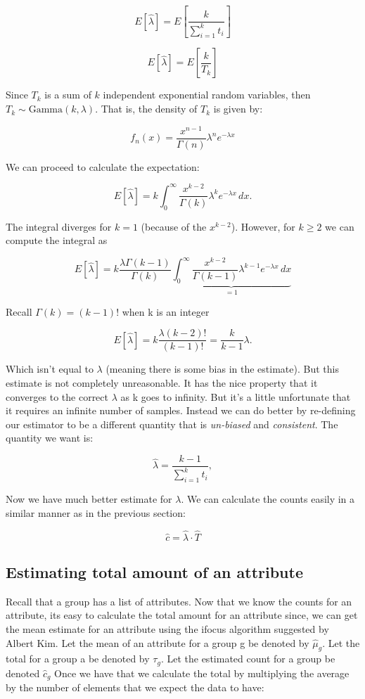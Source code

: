 \documentclass[a4paper]{article}
\begin{document}
$$E[\hat{\lambda}] = E[ \frac{k}{ \sum^{k}_{i=1} t_i } ]$$

$$E[\hat{\lambda}] = E[ \frac{k}{ T_k } ]$$

Since $T_k$ is a sum of $k$ independent exponential random variables, then $T_k\sim\mathrm{Gamma}(k,\lambda)$. That is, the density of $T_k$ is given by:

$$
f_n(x)=\frac{x^{n-1}}{\Gamma(n)}\lambda^ne^{-\lambda x}
$$

We can proceed to calculate the expectation:

$$
 E\left[\hat\lambda\right]=k\int_0^\infty\frac{x^{k-2}}{\Gamma(k)}\lambda^ke^{-\lambda x}\, dx.
$$

The integral diverges for $k=1$ (because of the $x^{k-2}$).
However, for $k\ge2$  we can compute the integral as

$$
 E\left[\hat\lambda \right]=k\frac{\lambda\Gamma(k-1)}{\Gamma(k)}\underbrace{\int_0^\infty\frac{x^{k-2}}{\Gamma(k-1)}\lambda^{k-1}e^{-\lambda x}\, dx}_{=1}
$$

Recall $\Gamma{(k)} = (k-1)!$ when k is an integer

$$
E[\hat{\lambda}] =  k\frac{\lambda (k-2)! }{(k-1)!}= \frac k{k-1}\lambda.
$$

Which isn't equal to $\lambda$ (meaning there is some bias in the estimate). 
But this estimate is not completely unreasonable.
It has the nice property that it converges to the correct $\lambda$ as k goes to infinity.
But it's a little unfortunate that it requires an infinite number of samples.
Instead we can do better by re-defining our estimator to be a different quantity that is {\it un-biased} and { \it consistent}.
The quantity we want is:

$$
\hat\lambda =\frac{k-1}{\sum_{i=1}^k t_i},
$$


Now we have much better estimate for $\lambda$.
We can calculate the counts easily in a similar manner as in the previous section:

$$\hat{c} = \hat{\lambda} \cdot \hat{T} $$

\subsection{Estimating total amount of an attribute}

Recall that a group has a list of attributes.
Now that we know the counts for an attribute, its easy to calculate the total amount for an attribute since, we can get the mean estimate for an attribute using the ifocus algorithm suggested by Albert Kim.
Let the mean of an attribute for a group g be denoted by $\hat{\mu}_g$. 
Let the total for a group a be denoted by $\tau_g$.
Let the estimated count for a group be denoted $\hat{c}_g$
Once we have that we calculate the total by multiplying the average by the number of elements that we expect the data to have:
\end{document}

